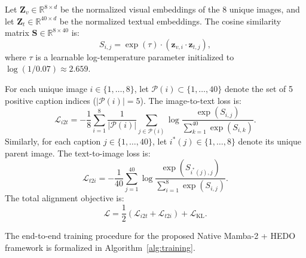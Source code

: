 \documentclass[10pt,journal,final]{IEEEtran}
\begin{document}
Let $\mathbf{Z}_v \in \mathbb{R}^{8 \times d}$ be the normalized visual embeddings of the 8 unique images, and let $\mathbf{Z}_t \in \mathbb{R}^{40 \times d}$ be the normalized textual embeddings. The cosine similarity matrix $\mathbf{S} \in \mathbb{R}^{8 \times 40}$ is:
\begin{equation}
\label{eq:similarity_matrix}
S_{i, j} = \exp(\tau) \cdot (\mathbf{z}_{v, i} \cdot \mathbf{z}_{t, j}),
\end{equation}
where $\tau$ is a learnable log-temperature parameter initialized to $\log(1/0.07) \approx 2.659$.

For each unique image $i \in \{1, \dots, 8\}$, let $\mathcal{P}(i) \subset \{1, \dots, 40\}$ denote the set of 5 positive caption indices ($|\mathcal{P}(i)| = 5$). The image-to-text loss is:
\begin{equation}
\label{eq:infonce_i2t}
\mathcal{L}_{i2t} = -\frac{1}{8} \sum_{i=1}^8 \frac{1}{|\mathcal{P}(i)|} \sum_{j \in \mathcal{P}(i)} \log \frac{\exp(S_{i, j})}{\sum_{k=1}^{40} \exp(S_{i, k})}.
\end{equation}
Similarly, for each caption $j \in \{1, \dots, 40\}$, let $i^*(j) \in \{1, \dots, 8\}$ denote its unique parent image. The text-to-image loss is:
\begin{equation}
\label{eq:infonce_t2i}
\mathcal{L}_{t2i} = -\frac{1}{40} \sum_{j=1}^{40} \log \frac{\exp(S_{i^*(j), j})}{\sum_{i=1}^{8} \exp(S_{i, j})}.
\end{equation}
The total alignment objective is:
\begin{equation}
\label{eq:total_loss}
\mathcal{L} = \frac{1}{2}\left( \mathcal{L}_{i2t} + \mathcal{L}_{t2i} \right) + \mathcal{L}_{\mathrm{KL}}.
\end{equation}

The end-to-end training procedure for the proposed Native Mamba-2 + HEDO framework is formalized in Algorithm~\ref{alg:training}.
\end{document}
